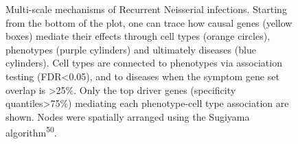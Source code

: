 \documentclass[
]{article}
\begin{document}
\label{cell-fig-network-rni}
\begin{figure}[H]


\caption{\label{fig-network-rni}Multi-scale mechanisms of Recurrent
Neisserial infections. Starting from the bottom of the plot, one can
trace how causal genes (yellow boxes) mediate their effects through cell
types (orange circles), phenotypes (purple cylinders) and ultimately
diseases (blue cylinders). Cell types are connected to phenotypes via
association testing (FDR\textless0.05), and to diseases when the symptom
gene set overlap is \textgreater25\%. Only the top driver genes
(specificity quantiles\textgreater75\%) mediating each phenotype-cell
type association are shown. Nodes were spatially arranged using the
Sugiyama algorithm\textsuperscript{50}.}

\end{figure}%
\end{document}
